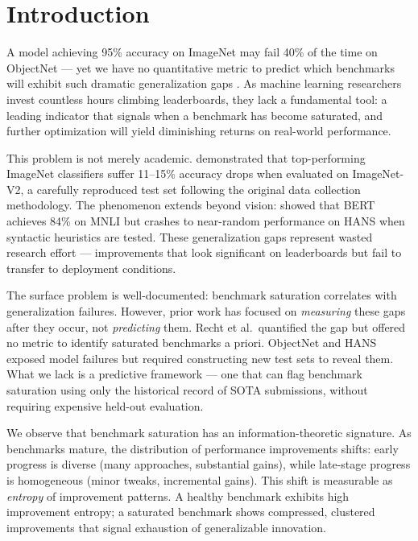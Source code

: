 \section{Introduction}
\label{sec:introduction}

A model achieving 95\% accuracy on ImageNet may fail 40\% of the time on ObjectNet --- yet we have no quantitative metric to predict which benchmarks will exhibit such dramatic generalization gaps \citep{barbu2019objectnet}. As machine learning researchers invest countless hours climbing leaderboards, they lack a fundamental tool: a leading indicator that signals when a benchmark has become saturated, and further optimization will yield diminishing returns on real-world performance.

This problem is not merely academic. \citet{recht2019imagenet} demonstrated that top-performing ImageNet classifiers suffer 11--15\% accuracy drops when evaluated on ImageNet-V2, a carefully reproduced test set following the original data collection methodology. The phenomenon extends beyond vision: \citet{mccoy2019right} showed that BERT achieves 84\% on MNLI but crashes to near-random performance on HANS when syntactic heuristics are tested. These generalization gaps represent wasted research effort --- improvements that look significant on leaderboards but fail to transfer to deployment conditions.

The surface problem is well-documented: benchmark saturation correlates with generalization failures. However, prior work has focused on \emph{measuring} these gaps after they occur, not \emph{predicting} them. Recht et al.\ quantified the gap but offered no metric to identify saturated benchmarks a priori. ObjectNet and HANS exposed model failures but required constructing new test sets to reveal them. What we lack is a predictive framework --- one that can flag benchmark saturation using only the historical record of SOTA submissions, without requiring expensive held-out evaluation.

We observe that benchmark saturation has an information-theoretic signature. As benchmarks mature, the distribution of performance improvements shifts: early progress is diverse (many approaches, substantial gains), while late-stage progress is homogeneous (minor tweaks, incremental gains). This shift is measurable as \emph{entropy} of improvement patterns. A healthy benchmark exhibits high improvement entropy; a saturated benchmark shows compressed, clustered improvements that signal exhaustion of generalizable innovation.

